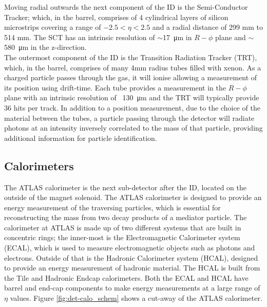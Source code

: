 Moving radial outwards the next component of the ID is the Semi-Conductor Tracker;
which, in the barrel, comprises of 4 cylindrical layers of silicon microstrips
covering a range of $-2.5 < \eta < 2.5$ and a radial distance of 299 mm to 514 mm.
The SCT has an intrinsic resolution of $\sim$\SI{17}{\micro\metre} in $R-\phi$ plane
and $\sim$\SI{580}{\micro\metre} in the z-direction. \\

The outermost component of the ID is the Transition Radiation Tracker (TRT),
which, in the barrel, comprises of many 4mm radius tubes filled with xenon.
As a charged particle passes through the gas,
it will ionise allowing a measurement of its position using drift-time.
Each tube provides a measurement in the $R-\phi$ plane with an intrinsic resolution of ~\SI{130}{\micro\metre}
and the TRT will typically provide 36 hits per track.
In addition to a position measurement, due to the choice of the material between the tubes,
a particle passing through the detector will radiate photons
at an intensity inversely correlated to the mass of that particle,
providing additional information for particle identification. \\


\subsection{Calorimeters}

The ATLAS calorimeter is the next sub-detector after the ID,
located on the outside of the magnet solenoid.
The ATLAS calorimeter is designed to provide an energy measurement of the traversing particles,
which is essential for reconstructing the mass from two decay products of a mediator particle.
The calorimeter at ATLAS is made up of two different systems that are built in concentric rings;
the inner-most is the Electromagnetic Calorimeter system (ECAL), which is used to measure electromagnetic objects such as photons and electrons.
Outside of that is the Hadronic Calorimeter system (HCAL), designed to provide an energy measurement of hadronic material.
The HCAL is built from the Tile and Hadronic Endcap calorimeters.
Both the ECAL and HCAL have barrel and end-cap components to make energy measurements at a large range of $\eta$ values.
Figure \ref{fig:det-calo_schem} shows a cut-away of the ATLAS calorimeter.\\

